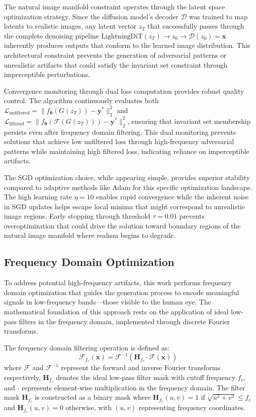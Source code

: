 The natural image manifold constraint operates through the latent space optimization strategy. Since the diffusion model's decoder $\mathcal{D}$ was trained to map latents to realistic images, any latent vector $z_T$ that successfully passes through the complete denoising pipeline $\text{LightningDiT}(z_T) \rightarrow z_0 \rightarrow \mathcal{D}(z_0) = \mathbf{x}$ inherently produces outputs that conform to the learned image distribution. This architectural constraint prevents the generation of adversarial patterns or unrealistic artifacts that could satisfy the invariant set constraint through imperceptible perturbations.

Convergence monitoring through dual loss computation provides robust quality control. The algorithm continuously evaluates both $\mathcal{L}_{\text{unfiltered}} = \|f_{\boldsymbol{\theta}}(G(z_T)) - \mathbf{y^*}\|_2^2$ and $\mathcal{L}_{\text{filtered}} = \|f_{\boldsymbol{\theta}}(\mathcal{F}(G(z_T))) - \mathbf{y^*}\|_2^2$, ensuring that invariant set membership persists even after frequency domain filtering. This dual monitoring prevents solutions that achieve low unfiltered loss through high-frequency adversarial patterns while maintaining high filtered loss, indicating reliance on imperceptible artifacts.

The SGD optimization choice, while appearing simple, provides superior stability compared to adaptive methods like Adam for this specific optimization landscape. The high learning rate $\eta = 10$ enables rapid convergence while the inherent noise in SGD updates helps escape local minima that might correspond to unrealistic image regions. Early stopping through threshold $\tau = 0.01$ prevents overoptimization that could drive the solution toward boundary regions of the natural image manifold where realism begins to degrade.

\subsection{Frequency Domain Optimization}

To address potential high-frequency artifacts, this work performs frequency domain optimization that guides the generation process to encode meaningful signals in low-frequency bands---those visible to the human eye. The mathematical foundation of this approach rests on the application of ideal low-pass filters in the frequency domain, implemented through discrete Fourier transforms.

The frequency domain filtering operation is defined as:
\begin{equation}
\mathcal{F}_{f_c}(\mathbf{x}) = \mathcal{F}^{-1}(\mathbf{H}_{f_c} \cdot \mathcal{F}(\mathbf{x}))
\end{equation}
where $\mathcal{F}$ and $\mathcal{F}^{-1}$ represent the forward and inverse Fourier transforms respectively, $\mathbf{H}_{f_c}$ denotes the ideal low-pass filter mask with cutoff frequency $f_c$, and $\cdot$ represents element-wise multiplication in the frequency domain. The filter mask $\mathbf{H}_{f_c}$ is constructed as a binary mask where $\mathbf{H}_{f_c}(u,v) = 1$ if $\sqrt{u^2 + v^2} \leq f_c$ and $\mathbf{H}_{f_c}(u,v) = 0$ otherwise, with $(u,v)$ representing frequency coordinates.

